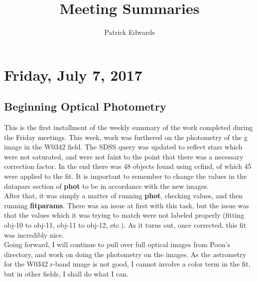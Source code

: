 \documentclass[a4paper]{article}
\title{Meeting Summaries}
\author{Patrick Edwards}
\begin{document}
\maketitle

\section{Friday, July 7, 2017}
\subsection{Beginning Optical Photometry}
This is the first installment of the weekly summary of the work completed during the Friday meetings.  This week, work was furthered on the photometry of the g image in the W0342 field.  The SDSS query was updated to reflect stars which were not saturated, and were not faint to the point that there was a necessary correction factor.  In the end there was 48 objects found using ccfind, of which 45 were applied to the fit.  It is important to remember to change the values in the datapars section of \textbf{phot} to be in accordance with the new images. \\
After that, it was simply a matter of running \textbf{phot}, checking values, and then running \textbf{fitparams}.  There was an issue at first with this task, but the issue was that the values which it was trying to match were not labeled properly (fitting obj-10 to obj-11, obj-11 to obj-12, etc.).  As it turns out, once corrected, this fit was incredibly nice.  \\
Going forward, I will continue to pull over full optical images from Poon's directory, and work on doing the photometry on the images.  As the astrometry for the W0342 r-band image is not good, I cannot involve a color term in the fit, but in other fields, I shall do what I can.
\end{document}
